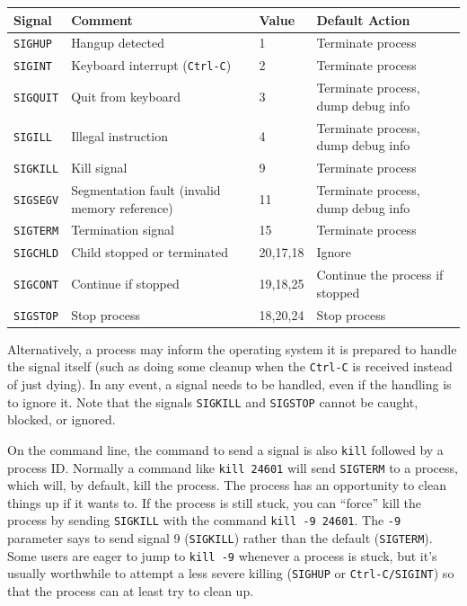 \begin{center}
	\begin{tabular}{l|l|l|l}
		\textbf{Signal}  & \textbf{Comment}                              & \textbf{Value} & \textbf{Default Action}            \\ \hline
		\texttt{SIGHUP}  & Hangup detected                               & 1              & Terminate process                  \\
		\texttt{SIGINT}  & Keyboard interrupt (\texttt{Ctrl-C})          & 2              & Terminate process                  \\
		\texttt{SIGQUIT} & Quit from keyboard                            & 3              & Terminate process, dump debug info \\
		\texttt{SIGILL}  & Illegal instruction                           & 4              & Terminate process, dump debug info \\
		\texttt{SIGKILL} & Kill signal                                   & 9              & Terminate process                  \\
		\texttt{SIGSEGV} & Segmentation fault (invalid memory reference) & 11             & Terminate process, dump debug info \\
		\texttt{SIGTERM} & Termination signal                            & 15             & Terminate process                  \\
		\texttt{SIGCHLD} & Child stopped or terminated                   & 20,17,18       & Ignore                             \\
		\texttt{SIGCONT} & Continue if stopped                           & 19,18,25       & Continue the process if stopped    \\
		\texttt{SIGSTOP} & Stop process                                  & 18,20,24       & Stop process                       \\
	\end{tabular}
\end{center}


Alternatively, a process may inform the operating system it is prepared to handle the signal itself (such as doing some cleanup when the \texttt{Ctrl-C} is received instead of just dying). In any event, a signal needs to be handled, even if the handling is to ignore it. Note that the signals \texttt{SIGKILL} and \texttt{SIGSTOP} cannot be caught, blocked, or ignored.

On the command line, the command to send a signal is also \texttt{kill} followed by a process ID. Normally a command like \texttt{kill 24601} will send \texttt{SIGTERM} to a process, which will, by default, kill the process. The process has an opportunity to clean things up if it wants to. If the process is still stuck, you can ``force'' kill the process by sending \texttt{SIGKILL} with the command \texttt{kill -9 24601}. The \texttt{-9} parameter says to send signal 9 (\texttt{SIGKILL}) rather than the default (\texttt{SIGTERM}). Some users are eager to jump to \texttt{kill -9} whenever a process is stuck, but it's usually worthwhile to attempt a less severe killing (\texttt{SIGHUP} or \texttt{Ctrl-C/SIGINT}) so that the process can at least try to clean up.



